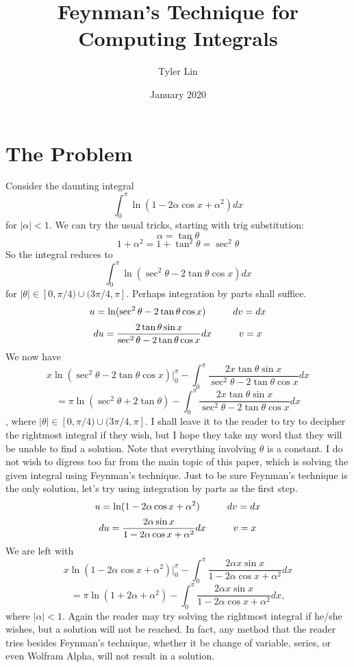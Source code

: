 \documentclass{article}
\title{Feynman's Technique for Computing Integrals}
\author{Tyler Lin}
\date{January 2020}
\begin{document}
\maketitle

\section*{The Problem}
Consider the daunting integral $$\int_{0}^{\pi} \ln(1-2\alpha\cos{x}+\alpha^2)dx$$ for $|\alpha|<1$. We can try the usual tricks, starting with trig substitution:
$$\alpha=\tan{\theta}$$
$$1+\alpha^2=1+\tan^2{\theta}=\sec^2{\theta}$$
So the integral reduces to $$\int_{0}^{\pi} \ln(\sec^2{\theta}-2\tan{\theta}\cos{x})dx$$ for $|\theta| \in [0,\pi/4) \cup (3\pi/4, \pi]$.
Perhaps integration by parts shall suffice.
$$u=\ln(\sec^2{\theta}-2\tan{\theta}\cos{x}) \hspace{10mm} dv=dx$$
$$du=\frac{2\tan{\theta}\sin{x}}{\sec^2{\theta}-2\tan{\theta}\cos{x}}dx \hspace{10mm} v=x$$
We now have
$$x\ln(\sec^2{\theta}-2\tan{\theta}\cos{x})\bigg\vert_{0}^{\pi} - \int_{0}^{\pi} \frac{2x\tan{\theta}\sin{x}}{\sec^2{\theta}-2\tan{\theta}\cos{x}}dx$$
$$= \pi\ln(\sec^2{\theta}+2\tan{\theta}) - \int_{0}^{\pi} \frac{2x\tan{\theta}\sin{x}}{\sec^2{\theta}-2\tan{\theta}\cos{x}}dx$$,
where $|\theta| \in [0,\pi/4) \cup (3\pi/4, \pi]$.
\newline I shall leave it to the reader to try to decipher the rightmost integral if they wish, but I hope they take my word that they will be unable to find a solution. Note that everything involving $\theta$ is a constant.
\newline I do not wish to digress too far from the main topic of this paper, which is solving the given integral using Feynman's technique. Just to be sure Feynman's technique is the only solution, let's try using integration by parts as the first step. 
$$u=\ln(1-2\alpha\cos{x}+\alpha^2) \hspace{10mm} dv=dx$$
$$du=\frac{2\alpha\sin{x}}{1-2\alpha\cos{x}+\alpha^2}dx \hspace{10mm} v=x$$
We are left with
$$x\ln(1-2\alpha\cos{x}+\alpha^2)\bigg\vert_{0}^{\pi} - \int_{0}^{\pi}\frac{2\alpha{x}\sin{x}}{1-2\alpha\cos{x}+\alpha^2}dx$$
$$= \pi\ln(1+2\alpha+\alpha^2) - \int_{0}^{\pi}\frac{2\alpha{x}\sin{x}}{1-2\alpha\cos{x}+\alpha^2}dx,$$
where $|\alpha|<1$. 
\newline Again the reader may try solving the rightmost integral if he/she wishes, but a solution will not be reached. In fact, any method that the reader tries besides Feynman's technique, whether it be change of variable, series, or even Wolfram Alpha, will not result in a solution.
\end{document}
